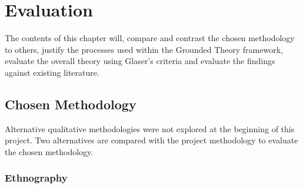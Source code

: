 \chapter{Evaluation}\label{C:Evaluation}

\par The contents of this chapter will, compare and contrast the chosen methodology to others, justify the processes used within the Grounded Theory framework, evaluate the overall theory using Glaser's criteria and evaluate the findings against existing literature.

\section{Chosen Methodology}

Alternative qualitative methodologies were not explored at the beginning of this project. Two alternatives are compared with the project methodology to evaluate the chosen methodology. 

\subsection{Ethnography}

